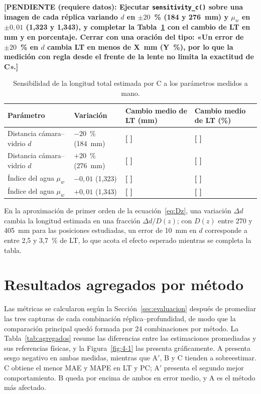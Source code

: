 \documentclass{report}
\newcommand{\Aprime}{A$'$}
\newcommand{\pendiente}[1]{\par\textbf{[PENDIENTE (requiere datos): #1]}\par}
\newcommand{\pend}[1]{\textbf{[#1]}}
\begin{document}
\pendiente{Ejecutar \texttt{sensitivity\_c()} sobre una imagen de cada réplica variando $d$ en $\pm 20$~\% (184 y 276~mm) y $\mu_w$ en $\pm 0{,}01$ (1,323 y 1,343), y completar la Tabla~\ref{tab:sensibilidad} con el cambio de LT en mm y en porcentaje. Cerrar con una oración del tipo: «Un error de $\pm 20$~\% en $d$ cambia LT en menos de X~mm (Y~\%), por lo que la medición con regla desde el frente de la lente no limita la exactitud de C».}

\begin{table}[htbp]

\caption{Sensibilidad de la longitud total estimada por C a los parámetros medidos a mano.}
\label{tab:sensibilidad}
\begin{tabular}{@{}p{4cm}p{2.6cm}p{2.8cm}p{2.8cm}@{}}
\hline
Parámetro & Variación & Cambio medio de LT (mm) & Cambio medio de LT (\%) \\
\hline
Distancia cámara--vidrio $d$ & $-20$~\% (184~mm) & \pend{ } & \pend{ } \\
Distancia cámara--vidrio $d$ & $+20$~\% (276~mm) & \pend{ } & \pend{ } \\
Índice del agua $\mu_w$ & $-0{,}01$ (1,323) & \pend{ } & \pend{ } \\
Índice del agua $\mu_w$ & $+0{,}01$ (1,343) & \pend{ } & \pend{ } \\
\hline
\end{tabular}
\end{table}

En la aproximación de primer orden de la ecuación~\eqref{eq:Dz}, una variación $\Delta d$ cambia la longitud estimada en una fracción $\Delta d / D(z)$; con $D(z)$ entre 270 y 405~mm para las posiciones estudiadas, un error de 10~mm en $d$ corresponde a entre 2,5 y 3,7~\% de LT, lo que acota el efecto esperado mientras se completa la tabla.

\section{Resultados agregados por método}
\label{sec:agregados}

Las métricas se calcularon según la Sección~\ref{sec:evaluacion} después de promediar las tres capturas de cada combinación réplica--profundidad, de modo que la comparación principal quedó formada por 24 combinaciones por método. La Tabla~\ref{tab:agregados} resume las diferencias entre las estimaciones promediadas y sus referencias físicas, y la Figura~\ref{fig:4-1} las presenta gráficamente. A presenta sesgo negativo en ambas medidas, mientras que \Aprime, B y C tienden a sobreestimar. C obtiene el menor MAE y MAPE en LT y PC; \Aprime{} presenta el segundo mejor comportamiento. B queda por encima de ambos en error medio, y A es el método más afectado.
\end{document}

